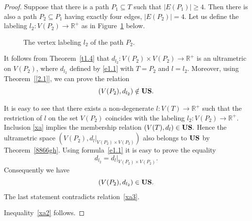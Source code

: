 \documentclass[11pt]{article}
\theoremstyle{definition}
\theoremstyle{remark}
\numberwithin{equation}{section}
\begin{document}
\begin{proof}
    

Suppose that there is a path \( P_1 \subseteq T \) such that 
$
|E(P_1)| \geq 4.
$
Then there is also a path \( P_2 \subseteq P_1 \) having exactly four edges,
$
    |E(P_2)| = 4.
$
Let us define the labeling $l_2\colon V(P_2)\to {\mathbb R^+}$ as in Figure~\ref{fis1} below. 


\begin{figure}[H]
\centering
\begin{center}
\end{center}
\caption{The vertex labeling $l_2$  of the path $P_2$.}
\label{fis1}
\end{figure}


It follows from Theorem~\ref{t1.4} that $d_{l_2} \colon V(P_2)\times V(P_2)\to\mathbb R^+$ is an ultrametric on $V(P_2)$, where $d_{l_2}$ defined by \eqref{e1.1} with $T=P_2$ and $l=l_2$. 
Moreover, using Theorem~\ref{[2.1]}, we can prove the relation 
\begin{equation}\label{xa3}
    (V(P_2),d_{l_2})\notin {\bf US}.
\end{equation}



It is easy to see that there exists a non-degenerate
\( l : V(T) \to \mathbb{R}^+ \)
such that the restriction of $l$ on the set $V(P_2)$ coincides with the labeling
\( l_2 : V(P_2) \to \mathbb{R}^+ \).
Inclusion \eqref{xa} implies the membership relation $(V(T), d_l) \in {\bf US}.$
Hence the ultrametric space $
(V(P_2), d_l \big|_{ V(P_2) \times V(P_2)})
$
also belongs to \( {\bf US}\) by Theorem~\ref{8866gh}. 
Using formula~\eqref{e1.1} it is easy to prove the equality
\[
d_{l_2} = d_l\big|_{V(P_2) \times V(P_2)}.
\]
Consequently we have
\[
(V(P_2), d_{l_2}) \in {\bf US}.
\]
The last statement contradicts relation~\eqref{xa3}. 

Inequality~\eqref{xa2} follows.
\end{proof}
\end{document}
